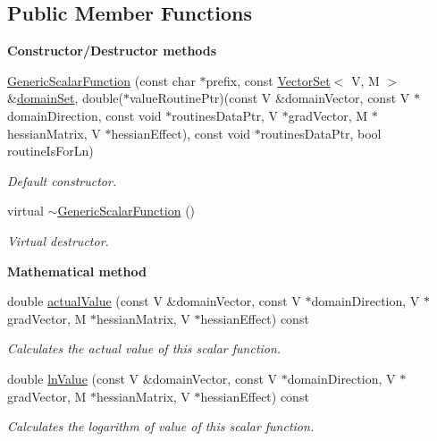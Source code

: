 \subsection*{Public Member Functions}
\begin{Indent}{\bf Constructor/\-Destructor methods}\par
\begin{DoxyCompactItemize}
\item 
\hyperlink{class_q_u_e_s_o_1_1_generic_scalar_function_a4619abc294e9703b564b4c034211f078}{Generic\-Scalar\-Function} (const char $\ast$prefix, const \hyperlink{class_q_u_e_s_o_1_1_vector_set}{Vector\-Set}$<$ V, M $>$ \&\hyperlink{class_q_u_e_s_o_1_1_base_scalar_function_ad0937628825249dd36ded3ce0c7959ac}{domain\-Set}, double($\ast$value\-Routine\-Ptr)(const V \&domain\-Vector, const V $\ast$domain\-Direction, const void $\ast$routines\-Data\-Ptr, V $\ast$grad\-Vector, M $\ast$hessian\-Matrix, V $\ast$hessian\-Effect), const void $\ast$routines\-Data\-Ptr, bool routine\-Is\-For\-Ln)
\begin{DoxyCompactList}\small\item\em Default constructor. \end{DoxyCompactList}\item 
virtual \hyperlink{class_q_u_e_s_o_1_1_generic_scalar_function_ae88df82626c01d80179d6380c5c3dcf0}{$\sim$\-Generic\-Scalar\-Function} ()
\begin{DoxyCompactList}\small\item\em Virtual destructor. \end{DoxyCompactList}\end{DoxyCompactItemize}
\end{Indent}
\begin{Indent}{\bf Mathematical method}\par
\begin{DoxyCompactItemize}
\item 
double \hyperlink{class_q_u_e_s_o_1_1_generic_scalar_function_a8629ec7c184b58254b147294e52e8c4c}{actual\-Value} (const V \&domain\-Vector, const V $\ast$domain\-Direction, V $\ast$grad\-Vector, M $\ast$hessian\-Matrix, V $\ast$hessian\-Effect) const 
\begin{DoxyCompactList}\small\item\em Calculates the actual value of this scalar function. \end{DoxyCompactList}\item 
double \hyperlink{class_q_u_e_s_o_1_1_generic_scalar_function_a0e93bae1ceb42049353e798a8866fd77}{ln\-Value} (const V \&domain\-Vector, const V $\ast$domain\-Direction, V $\ast$grad\-Vector, M $\ast$hessian\-Matrix, V $\ast$hessian\-Effect) const 
\begin{DoxyCompactList}\small\item\em Calculates the logarithm of value of this scalar function. \end{DoxyCompactList}\end{DoxyCompactItemize}
\end{Indent}
